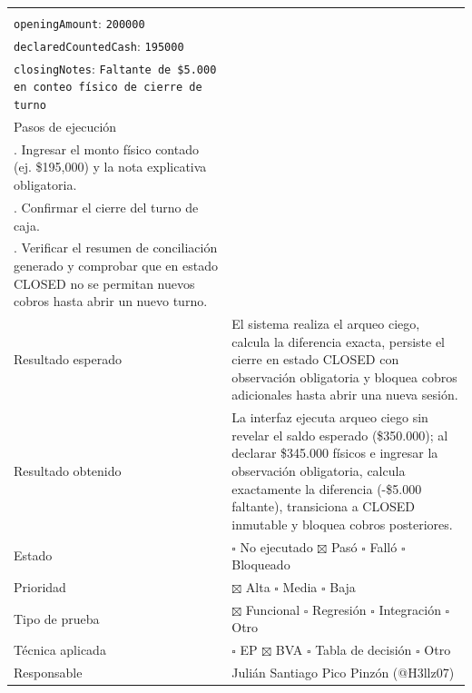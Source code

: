 \documentclass[10pt,a4paper]{article}
\begin{document}
{\begin{longtable}[]{@{}
  >{\raggedright\arraybackslash}p{}
  >{\raggedright\arraybackslash}p{}@{}}
\begin{minipage}[t]{\linewidth}
\texttt{route}: \texttt{\textquotedbl{}/\allowbreak{}cashier\textquotedbl{}}\\
\texttt{openingAmount}: \texttt{200000}\\
\texttt{declaredCountedCas\allowbreak{}h}: \texttt{195000}\\
\texttt{closingNotes}: \texttt{\textquotedbl{}Faltante de \$5.\allowbreak{}000 en conteo físi\allowbreak{}co de cierre de tu\allowbreak{}rno\textquotedbl{}}\strut
\end{minipage} \\
Pasos de ejecución & \begin{minipage}[t]{\linewidth}\raggedright
1. En /cashier, dirigirse a la sección "Blind Cash Count (Arqueo a Ciegas)" verificando que no se revele el efectivo esperado antes de declarar el conteo físico.\\
2. Ingresar el monto físico contado (ej. \$195,000) y la nota explicativa obligatoria.\\
3. Confirmar el cierre del turno de caja.\\
4. Verificar el resumen de conciliación generado y comprobar que en estado CLOSED no se permitan nuevos cobros hasta abrir un nuevo turno.\strut
\end{minipage} \\
Resultado esperado & El sistema realiza el arqueo ciego, calcula la diferencia exacta, persiste el cierre en estado CLOSED con observación obligatoria y bloquea cobros adicionales hasta abrir una nueva sesión. \\
Resultado obtenido & La interfaz ejecuta arqueo ciego sin revelar el saldo esperado (\$350.000); al declarar \$345.000 físicos e ingresar la observación obligatoria, calcula exactamente la diferencia (-\$5.000 faltante), transiciona a CLOSED inmutable y bloquea cobros posteriores. \\
Estado & \ensuremath{\square} No ejecutado \ensuremath{\boxtimes} Pasó \ensuremath{\square} Falló \ensuremath{\square} Bloqueado \\
Prioridad & \ensuremath{\boxtimes} Alta \ensuremath{\square} Media \ensuremath{\square} Baja \\
Tipo de prueba & \ensuremath{\boxtimes} Funcional \ensuremath{\square} Regresión \ensuremath{\square} Integración \ensuremath{\square} Otro \\
Técnica aplicada & \ensuremath{\square} EP \ensuremath{\boxtimes} BVA \ensuremath{\square} Tabla de decisión \ensuremath{\square} Otro \\
Responsable & Julián Santiago Pico Pinzón (@H3llz07) \\

\end{longtable}}
\end{document}
